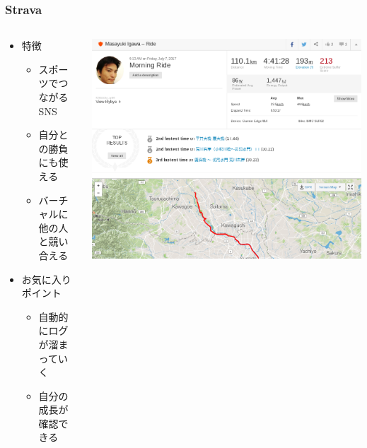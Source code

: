 \documentclass[aspectratio=169,11pt,hyperref={colorlinks=true}]{beamer}
\begin{document}
\begin{frame}
  \frametitle{Strava}
  \begin{columns}[T]
    \begin{column}{.50\textwidth}
      \begin{itemize}
      \item[] 特徴
        \begin{itemize}
        \item スポーツでつながるSNS
        \item 自分との勝負にも使える
        \item バーチャルに他の人と競い合える
        \end{itemize}
      \item[] お気に入りポイント
        \begin{itemize}
        \item 自動的にログが溜まっていく
        \item 自分の成長が確認できる
        \end{itemize}
      \end{itemize}
    \end{column}
    \begin{column}{.50\textwidth}
      \begin{center}
        \includegraphics[width=1.1\textwidth]{strava_1.png}
      \end{center}
    \end{column}
  \end{columns}
\end{frame}
\end{document}
